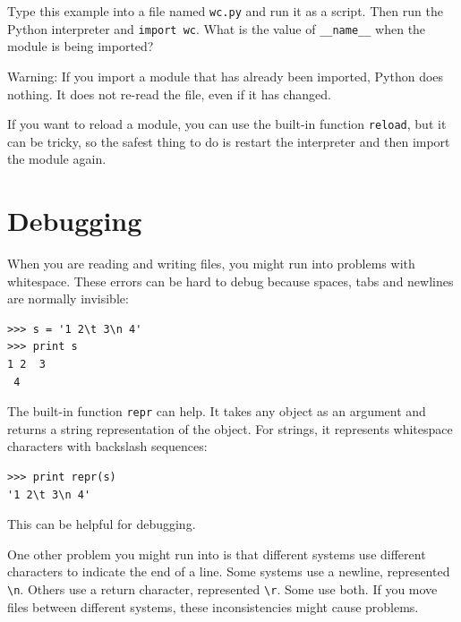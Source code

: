 \documentclass[10pt]{book}
\begin{document}
\begin{ex}
Type this example into a file named {\tt wc.py} and run
it as a script.  Then run the Python interpreter and
{\tt import wc}.  What is the value of \verb"__name__"
when the module is being imported?

Warning: If you import a module that has already been imported,
Python does nothing.  It does not re-read the file, even if it has
changed.


If you want to reload a module, you can use the built-in function 
{\tt reload}, but it can be tricky, so the safest thing to do is
restart the interpreter and then import the module again.
\end{ex}



\section{Debugging}


When you are reading and writing files, you might run into problems
with whitespace.  These errors can be hard to debug because spaces,
tabs and newlines are normally invisible:

\beforeverb
\begin{verbatim}
>>> s = '1 2\t 3\n 4'
>>> print s
1 2	 3
 4
\end{verbatim}
\afterverb


The built-in function {\tt repr} can help.  It takes any object as an
argument and returns a string representation of the object.  For
strings, it represents whitespace
characters with backslash sequences:

\beforeverb
\begin{verbatim}
>>> print repr(s)
'1 2\t 3\n 4'
\end{verbatim}
\afterverb

This can be helpful for debugging.

One other problem you might run into is that different systems
use different characters to indicate the end of a line.  Some
systems use a newline, represented \verb"\n".  Others use
a return character, represented \verb"\r".  Some use both.
If you move files between different systems, these inconsistencies
might cause problems.
\end{document}
